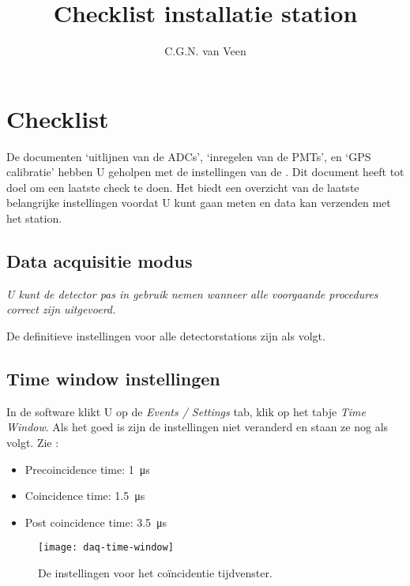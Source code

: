 

\title{Checklist installatie station}
\author{C.G.N. van Veen}



\maketitle

\section{Checklist}
De documenten `uitlijnen van de ADCs', `inregelen van de PMTs', en 
`GPS calibratie' hebben U geholpen met de instellingen van de \hisparc
\daq. Dit document heeft tot doel om een laatste check te doen. Het
biedt een overzicht van de laatste belangrijke instellingen voordat U kunt gaan
meten en data kan verzenden met het \hisparc station. 

\subsection{Data acquisitie modus}

\emph{U kunt de detector pas in gebruik nemen wanneer alle voorgaande procedures correct zijn uitgevoerd.}

De definitieve instellingen voor alle \hisparc detectorstations zijn als volgt.

\subsection{Time window instellingen}

In de \daq software klikt U op de \emph{Events / Settings} tab, klik op het 
tabje \emph{Time Window}. Als het goed is zijn de instellingen niet veranderd 
en staan ze nog als volgt. Zie :

\begin{itemize}
    \item Precoincidence time: \SI{1}{\micro\second}
    \item Coincidence time: \SI{1.5}{\micro\second}
    \item Post coincidence time: \SI{3.5}{\micro\second}
\end{itemize}

\begin{figure}
    \centering
    \texttt{[image: daq-time-window]}
    \caption{De instellingen voor het coïncidentie tijdvenster.}
    \label{fig:daq-time-window}
\end{figure}


